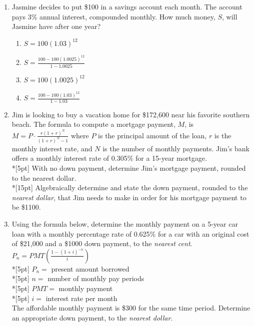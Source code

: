 \documentclass[12pt, oneside]{article}
\begin{document}
\begin{enumerate}
\item Jasmine decides to put \$100 in a savings account each month. The account pays 3\% annual interest, compounded monthly. How much money, $S$, will Jasmine have after one year?
\begin{enumerate}
    \item $S=100(1.03)^{12}$
    \item $\displaystyle S=\frac{100-100(1.0025)^{12}}{1-1.0025}$
    \item $S=100(1.0025)^{12}$
    \item $\displaystyle S=\frac{100-100(1.03)^{12}}{1-1.03}$
\end{enumerate} %

\item Jim is looking to buy a vacation home for \$172,600 near his favorite southern beach. The formula to compute a mortgage payment, $M$, is $\displaystyle M=P \cdot \frac{r(1+r)^N}{(1+r)^N-1}$ where $P$ is the principal amount of the loan, $r$ is the monthly interest rate, and $N$ is the number of monthly payments. Jim’s bank offers a monthly interest rate of 0.305\% for a 15-year mortgage.\\*[5pt]
With no down payment, determine Jim’s mortgage payment, rounded to the nearest dollar.\\*[15pt]
Algebraically determine and state the down payment, rounded to the \emph{nearest dollar}, that Jim needs to make in order for his mortgage payment to be \$1100.
 
\item Using the formula below, determine the monthly payment on a 5-year car loan with a monthly percentage rate of 0.625\% for a car with an original cost of \$21,000 and a \$1000 down payment, to the \emph{nearest cent}.\\
$\displaystyle P_n=PMT\left( \frac{1-(1+i)^{-n}}{i} \right)$\\*[5pt]
$P_n = $ present amount borrowed \\*[5pt]
$n = $ number of monthly pay periods\\*[5pt]
$PMT=$ monthly payment\\*[5pt]
$i=$ interest rate per month\\[1in]
The affordable monthly payment is \$300 for the same time period. Determine an appropriate down payment, to the \emph{nearest dollar}. %


\end{enumerate}
\end{document}
